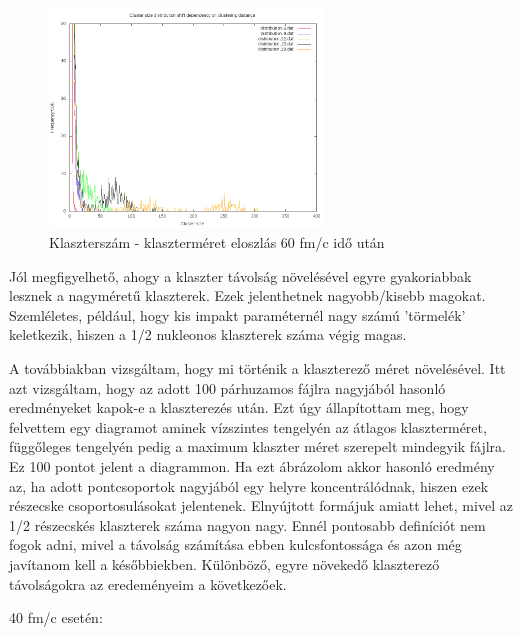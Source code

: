 \documentclass[a4paper,12pt]{article}
\begin{document}
	\begin{figure}[H]
		\centering
		\includegraphics[width=0.65\textwidth]{ShiftInDistro120.png}
		\caption{ Klaszterszám - klaszterméret eloszlás 60 fm/c idő után} 
\end{figure}
\par Jól megfigyelhető, ahogy a klaszter távolság növelésével egyre gyakoriabbak lesznek a nagyméretű klaszterek. Ezek jelenthetnek nagyobb/kisebb
magokat. Szemléletes, például, hogy kis impakt paraméternél nagy számú 'törmelék' keletkezik, hiszen a 1/2 nukleonos klaszterek száma végig magas.
\par A továbbiakban vizsgáltam, hogy mi történik a klaszterező méret növelésével. Itt azt vizsgáltam, hogy az adott 100 párhuzamos fájlra nagyjából 
hasonló eredményeket kapok-e a klaszterezés után. Ezt úgy állapítottam meg, hogy felvettem egy diagramot aminek vízszintes tengelyén az átlagos 
klaszterméret, függőleges tengelyén pedig a maximum klaszter méret szerepelt mindegyik fájlra. Ez 100 pontot jelent a diagrammon. Ha ezt ábrázolom
akkor hasonló eredmény az, ha adott pontcsoportok nagyjából egy helyre koncentrálódnak, hiszen ezek részecske csoportosulásokat jelentenek. Elnyújtott
formájuk amiatt lehet, mivel az 1/2 részecskés klaszterek száma nagyon nagy. Ennél pontosabb definíciót nem fogok adni, mivel a távolság számítása
ebben kulcsfontossága és azon még javítanom kell a későbbiekben. Különböző, egyre növekedő klaszterező távolságokra az eredeményeim a következőek.
\par 40 fm/c esetén:
\end{document}
